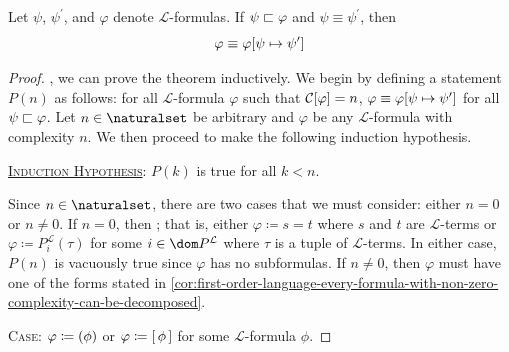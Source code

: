 \begin{thm}
     \label{logical-equivalence:substitution-theorem}
    Let \( \psi \), \( \psi^{\prime} \), and \( \varphi \) denote \( \mathcal{L} \)-formulas.
    If \( \psi  \sqsubset  \varphi \) and \( \psi \equiv \psi^{\prime} \),
    then
    \begin{equation*}
        \varphi \equiv \folsubformulasubstitution{\varphi}{\psi}{\psi^{\prime}}
    \end{equation*}
\end{thm}

\begin{proof}
    ,
    we can prove the theorem inductively. We begin by defining a statement \( P(n) \) as follows: for all \( \mathcal{L} \)-formula
    \( \varphi \) such that \( \folcomplexityofformula{\varphi} = n \), \( \varphi \equiv \folsubformulasubstitution{\varphi}{\psi}{\psi^{\prime}} \)
    for all \( \psi  \sqsubset  \varphi \). Let \( n \in \naturalset \) be arbitrary and \( \varphi \) be any \( \mathcal{L} \)-formula with complexity
    \( n \). We then proceed to make the following induction hypothesis.

    \vspace{0.3cm}
    \noindent
    \underline{\scshape Induction Hypothesis}: \( P(k) \) is true for all \( k < n \).

    \vspace{0.3cm}
    \noindent
    Since \( n \in \naturalset \), there are two cases that we must consider: either \( n = 0 \) or \( n \neq 0 \).
    If \( n = 0 \), then ;
    that is, either \( \varphi \coloneq s = t \) where \( s \) and \( t \) are \( \mathcal{L} \)-terms or
    \( \varphi \coloneq P^{\mathcal{L}}_{i}(\tau) \) for some \( i \in \dom P^{\mathcal{L}} \) where \( \tau \) is a tuple of \( \mathcal{L} \)-terms.
    In either case, \( P(n) \) is vacuously true since \( \varphi \) has no subformulas.
    If \( n \neq 0 \), then \( \varphi \) must have one of the forms stated in
    \cref{cor:first-order-language-every-formula-with-non-zero-complexity-can-be-decomposed}.

    \vspace{0.3cm}
    \noindent
    {\scshape Case}: \( \varphi \coloneq \mleft( \phi \mright) \) or \( \varphi \coloneq \mleft[ \,\phi\, \mright] \) for some \( \mathcal{L} \)-formula \( \phi \).


\end{proof}
